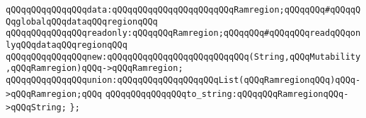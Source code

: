 \verb|qQQqqQQqqQQqqQQqdata:qQQqqQQqqQQqqQQqqQQqqQQqRamregion;qQQqqQQq#qQQqqQQqglobalqQQqdataqQQqregionqQQq|\newline
\verb|qQQqqQQqqQQqqQQqreadonly:qQQqqQQqRamregion;qQQqqQQq#qQQqqQQqreadqQQqonlyqQQqdataqQQqregionqQQq|\newline
\newline
\verb|qQQqqQQqqQQqqQQqnew:qQQqqQQqqQQqqQQqqQQqqQQqqQQq(String,qQQqMutability,qQQqRamregion)qQQq->qQQqRamregion;|\newline
\verb|qQQqqQQqqQQqqQQqunion:qQQqqQQqqQQqqQQqqQQqList(qQQqRamregionqQQq)qQQq->qQQqRamregion;qQQq|\newline
\newline
\verb|qQQqqQQqqQQqqQQqto_string:qQQqqQQqRamregionqQQq->qQQqString;|\newline
\verb|};|\newline


